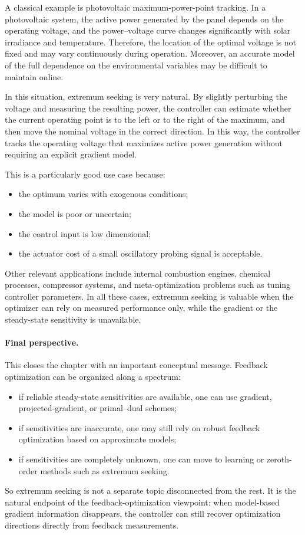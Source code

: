 A classical example is photovoltaic maximum-power-point tracking. In a photovoltaic system, the active power generated by the panel depends on the operating voltage, and the power--voltage curve changes significantly with solar irradiance and temperature. Therefore, the location of the optimal voltage is not fixed and may vary continuously during operation. Moreover, an accurate model of the full dependence on the environmental variables may be difficult to maintain online.

In this situation, extremum seeking is very natural. By slightly perturbing the voltage and measuring the resulting power, the controller can estimate whether the current operating point is to the left or to the right of the maximum, and then move the nominal voltage in the correct direction. In this way, the controller tracks the operating voltage that maximizes active power generation without requiring an explicit gradient model.

This is a particularly good use case because:
\begin{itemize}
    \item the optimum varies with exogenous conditions;
    \item the model is poor or uncertain;
    \item the control input is low dimensional;
    \item the actuator cost of a small oscillatory probing signal is acceptable.
\end{itemize}

Other relevant applications include internal combustion engines, chemical processes, compressor systems, and meta-optimization problems such as tuning controller parameters. In all these cases, extremum seeking is valuable when the optimizer can rely on measured performance only, while the gradient or the steady-state sensitivity is unavailable.

\paragraph{Final perspective.}
This closes the chapter with an important conceptual message. Feedback optimization can be organized along a spectrum:
\begin{itemize}
    \item if reliable steady-state sensitivities are available, one can use gradient, projected-gradient, or primal--dual schemes;
    \item if sensitivities are inaccurate, one may still rely on robust feedback optimization based on approximate models;
    \item if sensitivities are completely unknown, one can move to learning or zeroth-order methods such as extremum seeking.
\end{itemize}

So extremum seeking is not a separate topic disconnected from the rest. It is the natural endpoint of the feedback-optimization viewpoint: when model-based gradient information disappears, the controller can still recover optimization directions directly from feedback measurements.